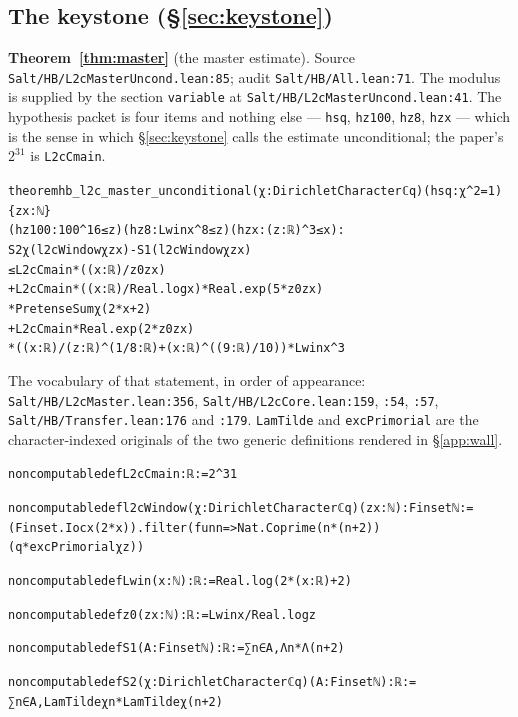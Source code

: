 \documentclass{CUP-JNL-FMP}
\newcommand{\leaninline}[1]{{\small\texttt{#1}}}
\theoremstyle{remark}
\begin{document}
\subsection{The keystone (\S\ref{sec:keystone})}

\medskip\noindent\textbf{Theorem~\ref{thm:master}} (the master estimate). Source
\leaninline{Salt/HB/L2cMasterUncond.lean:85}; audit
\leaninline{Salt/HB/All.lean:71}. The modulus is supplied by the section
\leaninline{variable} at \leaninline{Salt/HB/L2cMasterUncond.lean:41}. The
hypothesis packet is four items and nothing else --- \leaninline{hsq},
\leaninline{hz100}, \leaninline{hz8}, \leaninline{hzx} --- which is the sense in
which \S\ref{sec:keystone} calls the estimate unconditional; the paper's $2^{31}$
is \leaninline{L2cCmain}.
{\footnotesize\begin{alltt}
theorem hb_l2c_master_unconditional (χ : DirichletCharacter ℂ q) (hsq : χ ^ 2 = 1) \{z x : ℕ\}
    (hz100 : 100 ^ 16 ≤ z) (hz8 : Lwin x ^ 8 ≤ z) (hzx : (z : ℝ) ^ 3 ≤ x) :
    S2 χ (l2cWindow χ z x) - S1 (l2cWindow χ z x)
      ≤ L2cCmain * ((x : ℝ) / z0 z x)
        + L2cCmain * ((x : ℝ) / Real.log x) * Real.exp (5 * z0 z x)
            * PretenseSum χ (2 * x + 2)
        + L2cCmain * Real.exp (2 * z0 z x)
            * ((x : ℝ) / (z : ℝ) ^ (1 / 8 : ℝ) + (x : ℝ) ^ ((9 : ℝ) / 10)) * Lwin x ^ 3
\end{alltt}}

\noindent The vocabulary of that statement, in order of appearance:
\leaninline{Salt/HB/L2cMaster.lean:356}, \leaninline{Salt/HB/L2cCore.lean:159},
\leaninline{:54}, \leaninline{:57}, \leaninline{Salt/HB/Transfer.lean:176} and
\leaninline{:179}. \leaninline{LamTilde} and \leaninline{excPrimorial} are the
character-indexed originals of the two generic definitions rendered in
\S\ref{app:wall}.
{\footnotesize\begin{alltt}
noncomputable def L2cCmain : ℝ := 2 ^ 31

noncomputable def l2cWindow (χ : DirichletCharacter ℂ q) (z x : ℕ) : Finset ℕ :=
  (Finset.Ioc x (2 * x)).filter (fun n => Nat.Coprime (n * (n + 2)) (q * excPrimorial χ z))

noncomputable def Lwin (x : ℕ) : ℝ := Real.log (2 * (x : ℝ) + 2)

noncomputable def z0 (z x : ℕ) : ℝ := Lwin x / Real.log z

noncomputable def S1 (A : Finset ℕ) : ℝ := ∑ n ∈ A, Λ n * Λ (n + 2)

noncomputable def S2 (χ : DirichletCharacter ℂ q) (A : Finset ℕ) : ℝ :=
  ∑ n ∈ A, LamTilde χ n * LamTilde χ (n + 2)
\end{alltt}}
\end{document}

